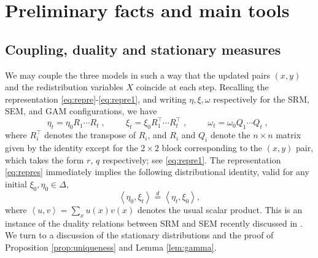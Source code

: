 \documentclass[11pt,reqno]{amsart}
\theoremstyle{remark}
\theoremstyle{definition}
\numberwithin{equation}{section}
\numberwithin{figure}{section}
\newcommand{\comma}{\; \text{,}\;\;}
\newcommand{\scalar}[2]{\left\langle #1, #2 \right\rangle}
\let\D=\Delta \let\F=\Phi  \let\G=\Gamma  \let\L=\Lambda \let\The=\Theta
\begin{document}
\section{Preliminary facts and main tools}\label{sec:prelim}



\subsection{Coupling, duality and stationary measures}
We may couple the three models in such a way that the updated pairs $(x,y)$ and the redistribution variables $X$ coincide at each step.  
Recalling the representation \eqref{eq:repre}-\eqref{eq:repre1}, and writing $\eta,\xi,\omega$ respectively for the SRM, SEM, and GAM configurations, we have
\begin{equation}\label{eq:repres}
	\eta_t = \eta_0 R_1\cdots R_t\comma\qquad \xi_t =  \xi_0 R^{\top}_1\cdots R^{\top}_t\comma\qquad 
	 \omega_t =\omega_0 Q_1\cdots Q_t\comma
\end{equation}
where $R^{\top}_i$ denotes the transpose of $R_i$, and $R_i$ and $Q_i$ denote the $n\times n$ matrix given by the identity except for the $2\times 2$ block corresponding to the $(x,y)$ pair, which takes the form $r$, $q$ respectively; see \eqref{eq:repre1}. The representation \eqref{eq:repres} immediately implies the following distributional identity, valid for any initial $\xi_0,\eta_0\in\D$,
\begin{equation}\label{eq:dual}
	\scalar{\eta_0}{\xi_t}\overset{d}{=}\scalar{\eta_t}{\xi_0} ,
\end{equation}
where $\scalar{u}{v}=\sum_xu(x)v(x)$ denotes the usual scalar product. This is an instance of the duality relations between SRM and SEM recently discussed in \cite{de_masi_ferrari_gabrielli_hidden_2023,giardina_redig_tol_intertwining_2024,kim2025spectral}.
We turn to a discussion of the stationary distributions and the proof of Proposition \ref{prop:uniqueness} and Lemma \ref{lem:gamma}. 
\end{document}

